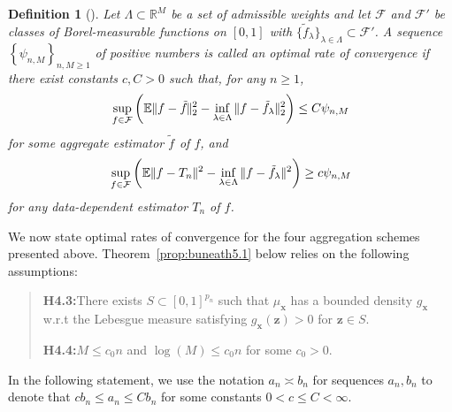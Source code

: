 \documentclass[11pt, letter paper]{article}
\newcommand{\1}{\mathmybb{1}}
\newtheorem{definition}{Definition}[section]
\newcommand{\R}{\mathbb{R}}
\newcommand{\0}{\emptyset}
\newcommand{\E}{\mathbb{E}}
\newcommand{\paren}[1]{\left(#1 \right)}
\newcommand{\set}[1]{\left\{ #1 \right\}}
\newcommand{\norm}[1]{|\hspace{-1pt}|#1 |\hspace{-1pt}|}
\newcommand{\normsq}[1]{\norm{#1}^{2}}
\newcommand{\Fcal}{\mathcal{F}}
\newcommand{\x}{\boldsymbol{x}}
\newcommand{\z}{\boldsymbol{z}}
\newcommand{\ftilde}[1]{\tilde{f}_{#1}}
\begin{document}
\begin{definition}[\cite{tsybakov_introduction_2009}]
    Let \(\Lambda\subset\R^{M}\) be a set of admissible weights and let \(\Fcal\) and \(\Fcal'\) be classes of Borel-measurable functions on \([0,1]\) with \({\{\ftilde{\lambda}\}}_{\lambda\in\Lambda}\subset\Fcal'\). A sequence \(\set{\psi_{n,M}}_{n,M\geq1}\) of positive numbers is called an optimal rate of convergence if there exist constants \(c, C>0\) such that, for any \(n\geq 1\), 
    \begin{equation}\label{eq:orcupper}
        \sup_{f\in\Fcal}\paren{\E\normsq{f-\ftilde{}}_{2} - \inf_{\lambda\in\Lambda}\normsq{f - \ftilde{\lambda}}_{2}}\leq C\psi_{n,M}
    \end{equation}
    for some aggregate estimator \(\ftilde{}\) of \(f\), and 
    \begin{equation}\label{eq:orclower}
        \sup_{f\in\Fcal}\paren{\E\normsq{f - T_{n}} - \inf_{\lambda\in\Lambda}\normsq{f - \ftilde{\lambda}}}\geq c\psi_{n,M}     
    \end{equation}
    for any data-dependent estimator \(T_{n}\) of \(f\).
\end{definition}

We now state optimal rates of convergence for the four aggregation schemes presented above. Theorem~\ref{prop:buneath5.1} below relies on the following assumptions:

\begin{quotation}
\noindent\textbf{H4.3:}\quad There exists \(S\subset{[0,1]}^{p_{n}}\) such that \(\mu_{\x}\) has a bounded density \(g_{\x}\) w.r.t the Lebesgue measure satisfying \(g_{\x}(\z)>0\) for \(\z\in S\).

\vspace{3mm}

\noindent\textbf{H4.4:}\quad \(M\leq c_{0}n\) and \(\log(M)\leq c_{0}n\) for some \(c_{0}>0\).
\end{quotation}

In the following statement, we use the notation \(a_{n}\asymp b_{n}\) for sequences \(a_{n}, b_{n}\) to denote that \(cb_{n}\leq a_{n}\leq Cb_{n}\) for some constants \(0<c\leq C<\infty\).
\end{document}
